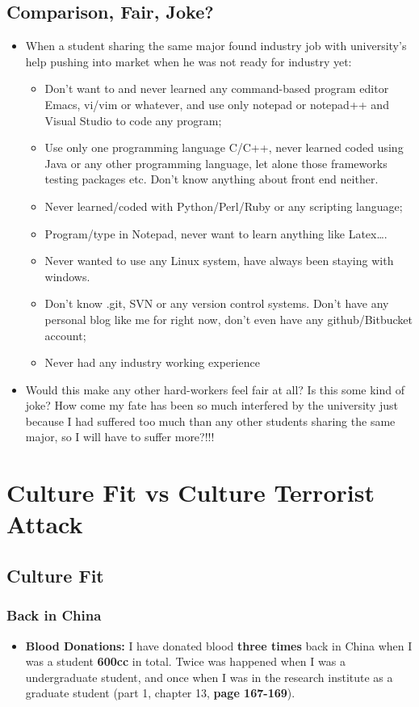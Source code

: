 \documentclass[9pt,b5paper]{article}
\begin{document}
\subsection{Comparison, Fair, Joke?}
\label{sec-11-1}
\begin{itemize}
\item When a student sharing the same major found industry job with university's help pushing into market when he was not ready for industry yet:
\begin{itemize}
\item Don't want to and never learned any command-based program editor Emacs, vi/vim or whatever, and use only notepad or notepad++ and Visual Studio to code any program;
\item Use only one programming language C/C++, never learned coded using Java or any other programming language, let alone those frameworks testing packages etc. Don't know anything about front end neither.
\item Never learned/coded with Python/Perl/Ruby or any scripting language;
\item Program/type in Notepad, never want to learn anything like Latex\ldots{}.
\item Never wanted to use any Linux system, have always been staying with windows.
\item Don't know .git, SVN or any version control systems. Don't have any personal blog like me for right now, don't even have any github/Bitbucket account;
\item Never had any industry working experience
\end{itemize}
\item Would this make any other hard-workers feel fair at all? Is this some kind of joke? How come my fate has been so much interfered by the university just because I had suffered too much than any other students sharing the same major, so I will have to suffer more?!!!
\end{itemize}

\section{Culture Fit vs Culture Terrorist Attack}
\label{sec-12}

\subsection{Culture Fit}
\label{sec-12-1}
\subsubsection{Back in China}
\label{sec-12-1-1}
\begin{itemize}
\item \textbf{Blood Donations:} I have donated blood \textbf{three times} back in China when I was a student \textbf{600cc} in total. Twice was happened when I was a undergraduate student, and once when I was in the research institute as a graduate student (part 1, chapter 13, \textbf{page 167-169}).
\end{itemize}
\end{document}
